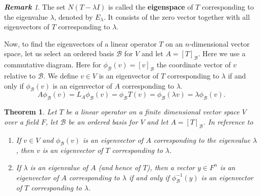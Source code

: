 \documentclass[12pt, a4paper]{article}
\newtheorem{theorem}{Theorem}[section]
\theoremstyle{definition}
\theoremstyle{remark}
\newtheorem*{remark}{\textbf{Remark}}
\newcommand{\B}{\mathscr{B}}
\begin{document}
\begin{remark}
The set $N(T - \lambda I)$ is called the \textbf{eigenspace} of $T$ corresponding to the eigenvalue $\lambda$, denoted by $E_\lambda$. It consists of the zero vector together with all eigenvectors of $T$ corresponding to $\lambda$.
\end{remark}

\begin{figure}[h]
    \centering
\end{figure}

Now, to find the eigenvectors of a linear operator $T$ on an $n$-dimensional vector space, let us select an ordered basis $\B$ for $V$ and let $A = [T]_\B$. Here we use a commutative diagram. Here for $\phi_\B(v) = [v]_\B$ the coordinate vector of $v$ relative to $\B$. We define $v \in V$ is an eigenvector of $T$ corresponding to $\lambda$ if and only if $\phi_\B(v)$ is an eigenvector of $A$ corresponding to $\lambda$.
\[
A \phi_\B(v) = L_A \phi_\B(v) = \phi_\B T(v) = \phi_\B(\lambda v) = \lambda \phi_\B(v).
\]

\begin{theorem}
Let $T$ be a linear operator on a finite dimensional vector space $V$ over a field $F$, let $\B$ be an ordered basis for $V$ and let $A = [T]_\B$. In reference to
\begin{figure}[h]
    \centering
\end{figure}
\begin{enumerate}
    \item If $v \in V$ and $\phi_\B(v)$ is an eigenvector of $A$ corresponding to the eigenvalue $\lambda$, then $v$ is an eigenvector of $T$ corresponding to $\lambda$.
    \item If $\lambda$ is an eigenvalue of $A$ (and hence of $T$), then a vector $y \in F^n$ is an eigenvector of $A$ corresponding to $\lambda$ if and only if $\phi_\B^{-1}(y)$ is an eigenvector of $T$ corresponding to $\lambda$.
\end{enumerate}
\end{theorem}
\end{document}
